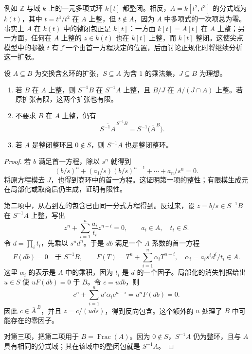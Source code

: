 例如 \(\mathbb Z\) 与域 \(k\) 上的一元多项式环 \(k[t]\) 都整闭。相反，\(A=k[t^2,t^3]\) 的分式域为 \(k(t)\)，其中 \(t=t^3/t^2\) 在 \(A\) 上整，但 \(t\notin A\)，因为 \(A\) 中多项式的一次项总为零。事实上 \(A\) 在 \(k(t)\) 中的整闭包正是 \(k[t]\)：一方面 \(k[t]=A[t]\) 在 \(A\) 上整；另一方面，任何在 \(A\) 上整的 \(z\in k(t)\) 也在 \(k[t]\) 上整，而 \(k[t]\) 整闭。这使尖点模型中的参数 \(t\) 有了一个由首一方程决定的位置，后面讨论正规化时将继续分析这一扩张。

\begin{proposition}
\label{g5:prop:integral-localization-quotient}
	设 \(A\subseteq B\) 为交换含幺环的扩张，\(S\subseteq A\) 为含 \(1\) 的乘法集，\(J\subseteq B\) 为理想。
	\begin{enumerate}
		\item 若 \(B\) 在 \(A\) 上整，则 \(S^{-1}B\) 在 \(S^{-1}A\) 上整，且 \(B/J\) 在 \(A/(J\cap A)\) 上整。若原扩张有限，这两个扩张也有限。
		\item 不要求 \(B\) 在 \(A\) 上整，仍有
		\[
			\overline{S^{-1}A}^{\,S^{-1}B}
			=S^{-1}\bigl(\overline A^{\,B}\bigr).
		\]
		\item 若 \(A\) 是整闭整环且 \(0\notin S\)，则 \(S^{-1}A\) 也是整闭整环。
	\end{enumerate}
\end{proposition}
\begin{proof}
	若 \(b\) 满足首一方程，除以 \(s^n\) 就得到
	\[
		(b/s)^n+(a_1/s)(b/s)^{n-1}+\cdots+a_n/s^n=0.
	\]
	将原方程模去 \(J\)，也得到商环中的首一方程。这证明第一项的整性；有限模生成元在局部化或取商后仍生成，证明有限性。

	第二项中，从右到左的包含已由同一分式方程得到。反过来，设 \(z=b/s\in S^{-1}B\) 在 \(S^{-1}A\) 上整，写出
	\[
		z^n+\sum_{i=1}^n\frac{a_i}{t_i}z^{n-i}=0,
		\qquad a_i\in A,\quad t_i\in S.
	\]
	令 \(d=\prod_i t_i\)，先乘以 \(s^n d^n\)。于是 \(db\) 满足一个 \(A\) 系数的首一方程
	\[
		F(db)=0\quad\text{于 }S^{-1}B,\qquad
		F(T)=T^n+\sum_{i=1}^n\alpha_iT^{n-i},
		\quad \alpha_i=a_i s^i d^i/t_i\in A.
	\]
	这里 \(\alpha_i\) 的表示是 \(A\) 中的乘积，因为 \(t_i\) 是 \(d\) 的一个因子。局部化的消失判据给出 \(u\in S\) 使 \(uF(db)=0\) 于 \(B\)。令 \(c=udb\)，则
	\[
		c^n+\sum_{i=1}^n u^i\alpha_i c^{n-i}
		=u^nF(db)=0.
	\]
	因此 \(c\in\overline A^{\,B}\)，并且 \(z=c/(uds)\)，得到反向包含。这个额外的 \(u\) 处理了 \(B\) 中可能存在的零因子。

	对第三项，把第二项用于 \(B=\operatorname{Frac}(A)\)。因为 \(0\notin S\)，\(S^{-1}A\) 仍为整环，且与 \(A\) 具有相同的分式域；其在该域中的整闭包就是 \(S^{-1}A\)。
\end{proof}

